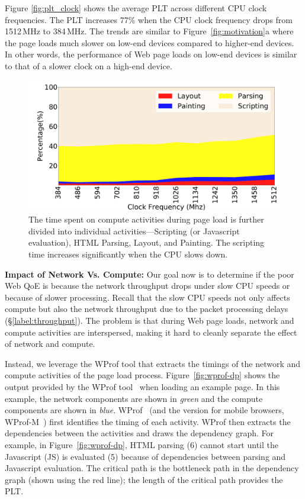 Figure \ref{fig:plt_clock} shows the average PLT across different CPU clock frequencies. The PLT increases 77\% when the CPU clock frequency drops from 1512\,MHz to 384\,MHz. The trends are similar to Figure~\ref{fig:motivation}a where the page loads much slower on low-end devices compared to higher-end devices. In other words, the performance of Web page loads on low-end devices is similar to that of a slower clock on a high-end device. 

\begin{figure}[t]
  \centering
  \includegraphics[width=\linewidth]{sections/device-work/plt-pie}
  \caption{The time spent on compute activities during page load is further divided into individual activities---Scripting (or Javascript evaluation), HTML Parsing, Layout, and Painting. The scripting time increases significantly when the CPU slows down.  }
  \label{fig:dissect}
\end{figure}
{\noindent \bf Impact of Network Vs. Compute:}
Our goal now is to determine if the poor Web QoE is because the network throughput drops under slow CPU speeds or  because of slower processing. Recall that the slow CPU speeds not only affects compute but also the network throughput due to the packet processing delays (\S\ref{label:throughput}). The problem is that during Web page loads, network and compute activities are interspersed, making it hard to cleanly separate the effect of network and compute. 

Instead, we leverage the WProf tool that extracts the timings of the network and compute activities of the page load process. Figure~\ref{fig:wprof-dp} shows the output provided by the WProf tool~\cite{wang2013demystifying,nejati2016depth} when loading an example page. In this example, the network components are shown in {\em green} and the compute components are shown in {\em blue}. WProf~\cite{wang2013demystifying} (and the version for mobile browsers, WProf-M~\cite{nejati2016depth}) first identifies the timing of each activity. WProf then extracts the dependencies between the activities and draws the dependency graph. For example, in Figure~\ref{fig:wprof-dp}, HTML parsing (6) cannot start until the Javascript (JS) is evaluated (5) because of dependencies between parsing and Javascript evaluation.  The critical path is the bottleneck path in the dependency graph (shown using the red line); the length of the critical path provides the PLT. %

